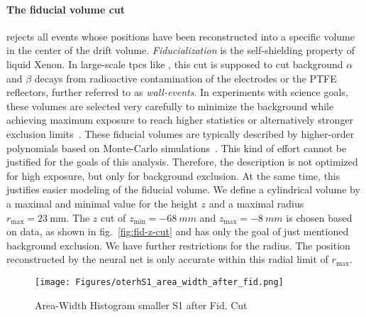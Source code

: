\paragraph{The fiducial volume cut} rejects all events whose positions have been reconstructed into a specific volume in the center of the drift volume.
\emph{Fiducialization} is the self-shielding property of liquid Xenon.
In large-scale \glspl{tpc} like \nton, this cut is supposed to cut background $\alpha$ and $\beta$ decays from radioactive contamination of the electrodes or the PTFE reflectors, further referred to as \emph{wall-events}.
In experiments with science goals, these volumes are selected very carefully to minimize the background while achieving maximum exposure to reach higher statistics or alternatively stronger exclusion limits~\cite{?}.  %
These fiducial volumes are typically described by higher-order polynomials based on Monte-Carlo simulations~\cite{?}. %
This kind of effort cannot be justified for the goals of this analysis.
Therefore, the description is not optimized for high exposure, but only for background exclusion.
At the same time, this justifies easier modeling of the fiducial volume.
We define a cylindrical volume by a maximal and minimal value for the height $z$ and a maximal radius $r_\mathrm{max} = \SI{23}{\milli\m}$.
The $z$ cut of $ z_\mathrm{min} = \SI{-68}{mm} $ and $ z_\mathrm{max} = \SI{-8}{mm} $ is chosen based on data, as shown in fig.~\ref{fig:fid-z-cut} and has only the goal of just mentioned background exclusion. We have further restrictions for the radius.
The position reconstructed by the neural net is only accurate within this radial limit of $r_\mathrm{max}$\cite{ABism}.


\begin{figure}[H]
\centering
\texttt{[image: Figures/oterhS1\_area\_width\_after\_fid.png]}  %
\caption[Area-Width Histogram smaller S1 after Fid. Cut]{
    Area-Width Histogram smaller S1 after Fid. Cut
    }
\label{fig:other_s1_area_width}
\end{figure}


